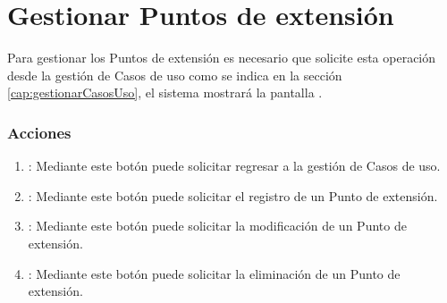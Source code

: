 
\section{Gestionar Puntos de extensión}

Para gestionar los Puntos de extensión es necesario que solicite esta operación desde la gestión de Casos de uso como se indica en la sección \ref{cap:gestionarCasosUso}, el sistema mostrará la pantalla .


\subsubsection{Acciones}

\begin{enumerate}
	\item {}: Mediante este botón puede solicitar regresar a la gestión de Casos de uso.
	\item {}: Mediante este botón puede solicitar el registro de un Punto de extensión.
	\item {}: Mediante este botón puede solicitar la modificación de un Punto de extensión.
	\item {}: Mediante este botón puede solicitar la eliminación de un Punto de extensión.
\end{enumerate}



